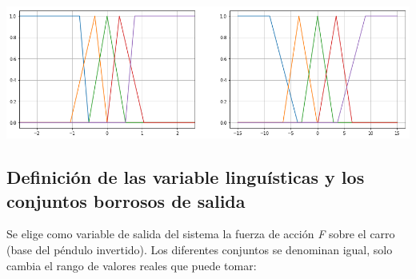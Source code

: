 \documentclass[onecolumn]{article}
\begin{document}
\includegraphics{output_14_0.png}

\hypertarget{definiciuxf3n-de-las-variable-linguuxedsticas-y-los-conjuntos-borrosos-de-salida}{%
\subsection{Definición de las variable linguísticas y los conjuntos
borrosos de
salida}\label{definiciuxf3n-de-las-variable-linguuxedsticas-y-los-conjuntos-borrosos-de-salida}}

Se elige como variable de salida del sistema la fuerza de acción
\emph{F} sobre el carro (base del péndulo invertido). Los diferentes
conjuntos se denominan igual, solo cambia el rango de valores reales que
puede tomar:
\end{document}
